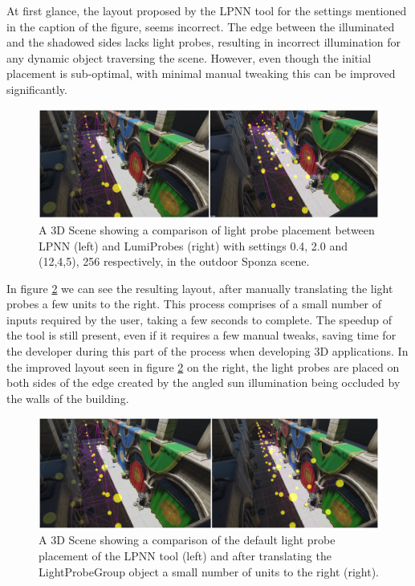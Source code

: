 At first glance, the layout proposed by the LPNN tool for the settings mentioned in the caption of the figure, seems incorrect. The edge between the illuminated and the shadowed sides lacks light probes, resulting in incorrect illumination for any dynamic object traversing the scene. However, even though the initial placement is sub-optimal, with minimal manual tweaking this can be improved significantly.

\begin{figure}[h]
	\centering
	\includegraphics[width=\linewidth]{Graphics/results/concats/comparison4.png}
	\caption{A 3D Scene showing a comparison of light probe placement between LPNN (left) and LumiProbes (right) with settings 0.4, 2.0 and (12,4,5), 256 respectively, in the outdoor Sponza scene.}
	\label{fig:comp5}
\end{figure}

In figure \ref{fig:comp6} we can see the resulting layout, after manually translating the light probes a few units to the right. This process comprises of a small number of inputs required by the user, taking a few seconds to complete. The speedup of the tool is still present, even if it requires a few manual tweaks, saving time for the developer during this part of the process when developing 3D applications. In the improved layout seen in figure \ref{fig:comp6} on the right, the light probes are placed on both sides of the edge created by the angled sun illumination being occluded by the walls of the building.\newline

\begin{figure}[H]
	\centering
	\includegraphics[width=\linewidth]{Graphics/results/concats/comparison5.png}
	\caption{A 3D Scene showing a comparison of the default light probe placement of the LPNN tool (left) and after translating the LightProbeGroup object a small number of units to the right (right).}
	\label{fig:comp6}
\end{figure}

